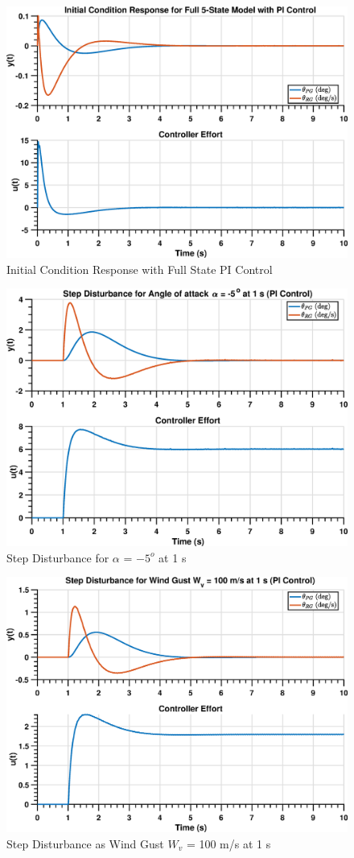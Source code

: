 \documentclass[12pt]{article}
\begin{document}
	\begin{figure}[H]
		\centering
		\includegraphics[width=0.8\linewidth]{LaunchVehicle_initialCond}
		\caption{Initial Condition Response with Full State PI Control}
		\label{fig:model5statespiinitialcond}
	\end{figure}
	
	\begin{figure}[H]
		\centering
		\includegraphics[width=0.8\linewidth]{LaunchVehicle_DisturbanceInAlpha}
		\caption{Step Disturbance for $\alpha$ = $-5^{o}$ at 1 s}
		\label{fig:model5statespidisturbanceinalpha}
	\end{figure}
	
	\begin{figure}[H]
		\centering
		\includegraphics[width=0.8\linewidth]{LaunchVehicle_DisturbanceInWind}
		\caption{Step Disturbance as Wind Gust $W_v$ = 100 m/s at 1 s}
		\label{fig:model5statespidisturbanceinwind}
	\end{figure}
	
\end{document}
